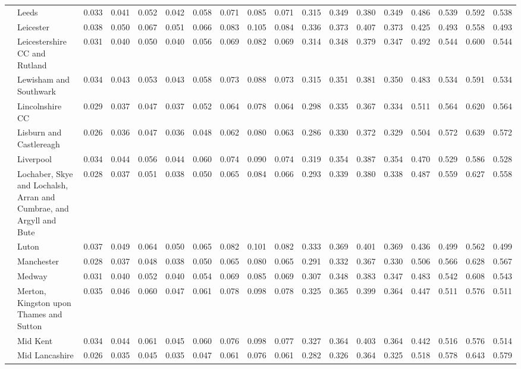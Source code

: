 \begin{tabular}{llrrrrrrrrrrrrrrrr}
 & Leeds & 0.033 & 0.041 & 0.052 & 0.042 & 0.058 & 0.071 & 0.085 & 0.071 & 0.315 & 0.349 & 0.380 & 0.349 & 0.486 & 0.539 & 0.592 & 0.538 \\
 & Leicester & 0.038 & 0.050 & 0.067 & 0.051 & 0.066 & 0.083 & 0.105 & 0.084 & 0.336 & 0.373 & 0.407 & 0.373 & 0.425 & 0.493 & 0.558 & 0.493 \\
 & Leicestershire CC and Rutland & 0.031 & 0.040 & 0.050 & 0.040 & 0.056 & 0.069 & 0.082 & 0.069 & 0.314 & 0.348 & 0.379 & 0.347 & 0.492 & 0.544 & 0.600 & 0.544 \\
 & Lewisham and Southwark & 0.034 & 0.043 & 0.053 & 0.043 & 0.058 & 0.073 & 0.088 & 0.073 & 0.315 & 0.351 & 0.381 & 0.350 & 0.483 & 0.534 & 0.591 & 0.534 \\
 & Lincolnshire CC & 0.029 & 0.037 & 0.047 & 0.037 & 0.052 & 0.064 & 0.078 & 0.064 & 0.298 & 0.335 & 0.367 & 0.334 & 0.511 & 0.564 & 0.620 & 0.564 \\
 & Lisburn and Castlereagh & 0.026 & 0.036 & 0.047 & 0.036 & 0.048 & 0.062 & 0.080 & 0.063 & 0.286 & 0.330 & 0.372 & 0.329 & 0.504 & 0.572 & 0.639 & 0.572 \\
 & Liverpool & 0.034 & 0.044 & 0.056 & 0.044 & 0.060 & 0.074 & 0.090 & 0.074 & 0.319 & 0.354 & 0.387 & 0.354 & 0.470 & 0.529 & 0.586 & 0.528 \\
 & Lochaber, Skye and Lochalsh, Arran and Cumbrae, and Argyll and Bute & 0.028 & 0.037 & 0.051 & 0.038 & 0.050 & 0.065 & 0.084 & 0.066 & 0.293 & 0.339 & 0.380 & 0.338 & 0.487 & 0.559 & 0.627 & 0.558 \\
 & Luton & 0.037 & 0.049 & 0.064 & 0.050 & 0.065 & 0.082 & 0.101 & 0.082 & 0.333 & 0.369 & 0.401 & 0.369 & 0.436 & 0.499 & 0.562 & 0.499 \\
 & Manchester & 0.028 & 0.037 & 0.048 & 0.038 & 0.050 & 0.065 & 0.080 & 0.065 & 0.291 & 0.332 & 0.367 & 0.330 & 0.506 & 0.566 & 0.628 & 0.567 \\
 & Medway & 0.031 & 0.040 & 0.052 & 0.040 & 0.054 & 0.069 & 0.085 & 0.069 & 0.307 & 0.348 & 0.383 & 0.347 & 0.483 & 0.542 & 0.608 & 0.543 \\
 & Merton, Kingston upon Thames and Sutton & 0.035 & 0.046 & 0.060 & 0.047 & 0.061 & 0.078 & 0.098 & 0.078 & 0.325 & 0.365 & 0.399 & 0.364 & 0.447 & 0.511 & 0.576 & 0.511 \\
 & Mid Kent & 0.034 & 0.044 & 0.061 & 0.045 & 0.060 & 0.076 & 0.098 & 0.077 & 0.327 & 0.364 & 0.403 & 0.364 & 0.442 & 0.516 & 0.576 & 0.514 \\
 & Mid Lancashire & 0.026 & 0.035 & 0.045 & 0.035 & 0.047 & 0.061 & 0.076 & 0.061 & 0.282 & 0.326 & 0.364 & 0.325 & 0.518 & 0.578 & 0.643 & 0.579 \\

\end{tabular}
